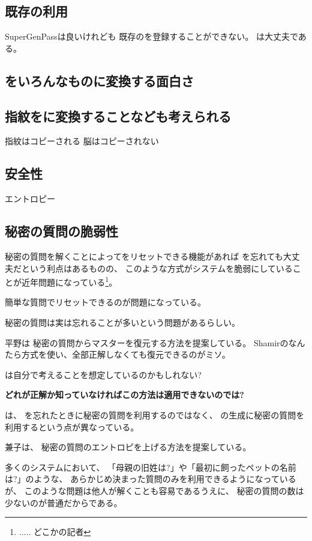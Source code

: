 \documentclass[twoside]{wiss}
\begin{document}
\subsection{既存{\PW}の利用}

SuperGenPass\cite{SuperGenPass}は良いけれども
既存の{\PW}を登録することができない。
{\EP}は大丈夫である。

\subsection{{\EM}をいろんなものに変換する面白さ}

\subsection{指紋を{\PW}に変換することなども考えられる}

指紋はコピーされる
脳はコピーされない

\subsection{安全性}

エントロピー

\subsection{秘密の質問の脆弱性}

秘密の質問を解くことによって{\PW}をリセットできる機能があれば
{\PW}を忘れても大丈夫だという利点はあるものの、
このような方式がシステムを脆弱にしていることが近年問題になっている\footnote{
  ..... どこかの記者
}。

簡単な質問でリセットできるのが問題になっている。

秘密の質問は実は忘れることが多いという問題があるらしい。

平野\cite{平野亮:2011-11-07}は
秘密の質問からマスター{\PW}を復元する方法を提案している。
Shamirのなんたら方式を使い、全部正解しなくても復元できるのがミソ。

{\PW}は自分で考えることを想定しているのかもしれない?

\textbf{どれが正解か知っていなければこの方法は適用できないのでは?}


{\EP}は、
{\PW}を忘れたときに秘密の質問を利用するのではなく、
{\PW}の生成に秘密の質問を利用するという点が異なっている。

兼子は、
秘密の質問のエントロピを上げる方法を提案している\cite{Kaneko}。

多くのシステムにおいて、
「母親の旧姓は?」や「最初に飼ったペットの名前は?」のような、
あらかじめ決まった質問のみを利用できるようになっているが、
このような問題は他人が解くことも容易であるうえに、
秘密の質問の数は少ないのが普通だからである\cite{Rabkin:2008:PKQ:1408664.1408667}。
\end{document}
